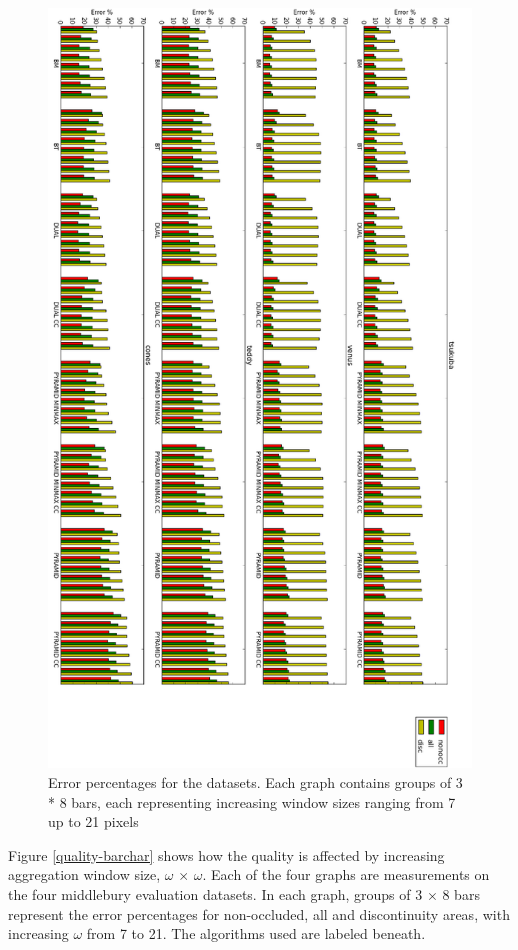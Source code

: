 \begin{figure}
  \centering
  \includegraphics[width=\textwidth,height=\textheight]{images/quality_barchart_flipped.png}
  \caption{Error percentages for the datasets. Each graph contains
    groups of 3 * 8 bars, each representing increasing window sizes
    ranging from 7 up to 21 pixels}
  \label{quality-barchart}
\end{figure}


Figure \ref{quality-barchar} shows how the quality is affected by increasing
aggregation window size, $\omega$ $\times$ $\omega$. Each of the four graphs
are measurements on the four middlebury evaluation datasets. In each graph,
groups of 3 $\times$ 8 bars represent the error percentages for non-occluded,
all and discontinuity areas, with increasing $\omega$ from 7 to 21. The
algorithms used are labeled beneath.

